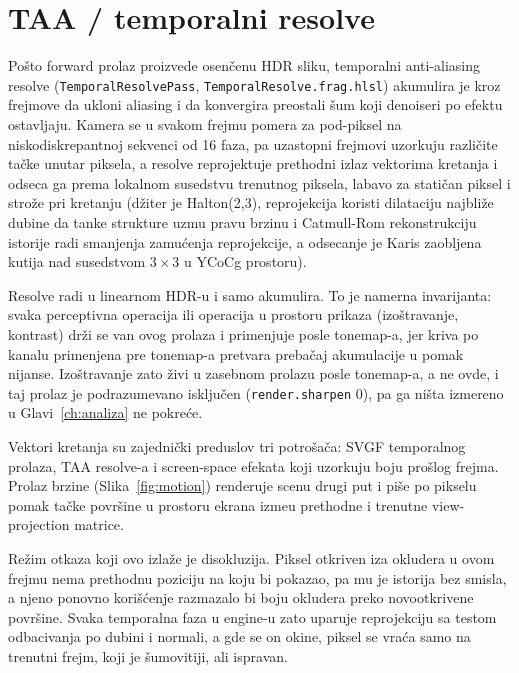 \section{TAA / temporalni resolve}
\label{sec:taa}

Po\v{s}to forward prolaz proizvede osen\v{c}enu HDR sliku, temporalni anti-aliasing resolve \cite{karis2014taa} (\texttt{TemporalResolvePass}, \texttt{TemporalResolve.frag.hlsl}) akumulira je kroz frejmove da ukloni aliasing i da konvergira preostali \v{s}um koji denoiseri po efektu ostavljaju. Kamera se u svakom frejmu pomera za pod-piksel na niskodiskrepantnoj sekvenci od 16 faza, pa uzastopni frejmovi uzorkuju razli\v{c}ite ta\v{c}ke unutar piksela, a resolve reprojektuje prethodni izlaz vektorima kretanja i odseca ga prema lokalnom susedstvu trenutnog piksela, labavo za stati\v{c}an piksel i stro\v{z}e pri kretanju (d\v{z}iter je Halton(2,3), reprojekcija koristi dilataciju najbli\v{z}e dubine da tanke strukture uzmu pravu brzinu i Catmull-Rom rekonstrukciju istorije radi smanjenja zamu\'cenja reprojekcije, a odsecanje je Karis zaobljena kutija nad susedstvom $3\times3$ u YCoCg prostoru).

Resolve radi u linearnom HDR-u i samo akumulira. To je namerna invarijanta: svaka perceptivna operacija ili operacija u prostoru prikaza (izo\v{s}travanje, kontrast) dr\v{z}i se van ovog prolaza i primenjuje posle tonemap-a, jer kriva po kanalu primenjena pre tonemap-a pretvara preba\v{c}aj akumulacije u pomak nijanse. Izo\v{s}travanje zato \v{z}ivi u zasebnom prolazu posle tonemap-a, a ne ovde, i taj prolaz je podrazumevano isklju\v{c}en (\texttt{render.sharpen} 0), pa ga ni\v{s}ta izmereno u Glavi~\ref{ch:analiza} ne pokre\'ce.

Vektori kretanja su zajedni\v{c}ki preduslov tri potro\v{s}a\v{c}a: SVGF temporalnog prolaza, TAA resolve-a i screen-space efekata koji uzorkuju boju pro\v{s}log frejma. Prolaz brzine (Slika~\ref{fig:motion}) renderuje scenu drugi put i pi\v{s}e po pikselu pomak ta\v{c}ke povr\v{s}ine u prostoru ekrana izme\dj{}u prethodne i trenutne view-projection matrice.

Re\v{z}im otkaza koji ovo izla\v{z}e je disokluzija. Piksel otkriven iza okludera u ovom frejmu nema prethodnu poziciju na koju bi pokazao, pa mu je istorija bez smisla, a njeno ponovno kori\v{s}\'cenje razmazalo bi boju okludera preko novootkrivene povr\v{s}ine. Svaka temporalna faza u engine-u zato uparuje reprojekciju sa testom odbacivanja po dubini i normali, a gde se on okine, piksel se vra\'ca samo na trenutni frejm, koji je \v{s}umovitiji, ali ispravan.


